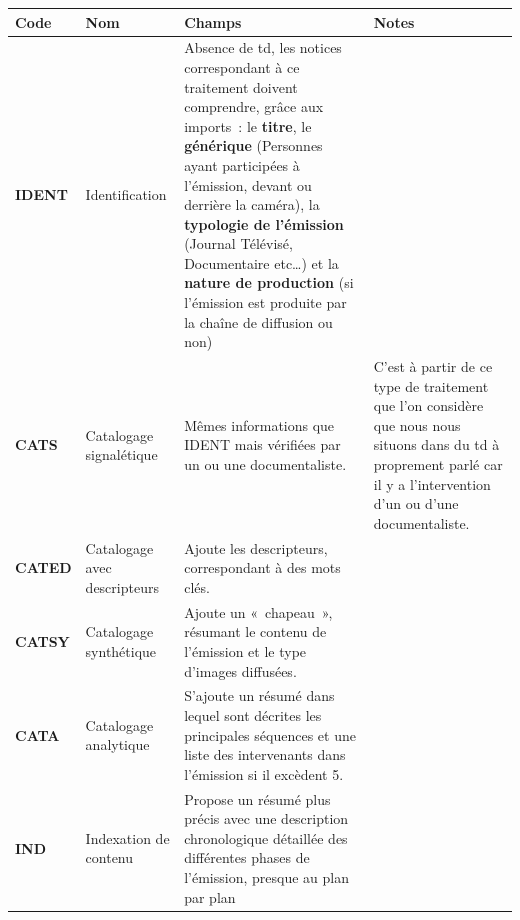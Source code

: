 \begin{longtable}{|p{}|p{}|p{}|p{}|}
	\hline
	\textbf{Code} & \textbf{Nom} & \textbf{Champs} & \textbf{Notes} \\
	
	\hline
	\endfirsthead %
	
	\textbf{IDENT} & 
	Identification &
	Absence de \gls{td}, les notices correspondant à ce traitement doivent comprendre, grâce aux imports : le \textbf{titre}, le \textbf{générique} (Personnes ayant participées à l’émission, devant ou derrière la caméra), la \textbf{typologie de l’émission} (Journal Télévisé, Documentaire etc\dots) et la \textbf{nature de production} (si l’émission est produite par la chaîne de diffusion ou non) &
	\\
	
	\hline
	
	\textbf{CATS} &
	Catalogage signalétique &
	Mêmes informations que IDENT mais vérifiées par un ou une documentaliste. &
	C'est à partir de ce type de traitement que l'on considère que nous nous situons dans du \gls{td} à proprement parlé car il y a l'intervention d'un ou d'une documentaliste.\\
	
	\hline
	
	\textbf{CATED} &
	Catalogage avec descripteurs &
	Ajoute les descripteurs, correspondant à des mots clés. &
 \\
 
	\hline
	
	\textbf{CATSY} &
	Catalogage synthétique &
	Ajoute un « chapeau », résumant le contenu de l’émission et le type d’images diffusées. &
	\\
	
	\hline
	
	\textbf{CATA} &
	Catalogage analytique &
	S’ajoute un résumé dans lequel sont décrites les principales séquences et une liste des intervenants dans l’émission si il excèdent 5. &
 \\
 
	\hline
	
	\textbf{IND} &
	Indexation de contenu &
	Propose un résumé plus précis avec une description chronologique détaillée des différentes phases de l’émission, presque au plan par plan
 \\
	\hline
\end{longtable}

